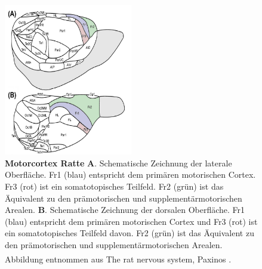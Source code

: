 \documentclass[12pt,a4paper,pdftex]{article}
\begin{document}
\begin{figure}[H]
    \centering
    \includegraphics[width=0.5\textwidth]{pictures/Bilder_Laura/rat_motorcortex_1.png}
    \caption[Motorcortex Ratte]{\textbf{Motorcortex Ratte} \textbf{A}. Schematische Zeichnung der laterale Oberfläche. Fr1 (blau) entspricht dem primären motorischen Cortex. Fr3 (rot) ist ein somatotopisches Teilfeld. Fr2 (grün) ist das Äquivalent zu den prämotorischen und supplementärmotorischen Arealen. \textbf{B}. Schematische Zeichnung der dorsalen Oberfläche. Fr1 (blau) entspricht dem primären motorischen Cortex und Fr3 (rot) ist ein somatotopisches Teilfeld davon. Fr2 (grün) ist das Äquivalent zu den prämotorischen und supplementärmotorischen Arealen. Abbildung entnommen aus The rat nervous system, Paxinos \textsuperscript{\cite[22]{paxinos2014rat}}.}
    \label{fig:motorcortex_ratte}
\end{figure}
\end{document}
